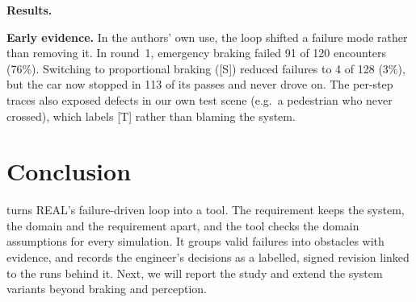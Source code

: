 \textbf{Results.} 

\textbf{Early evidence.} In the authors' own use, the loop shifted a failure
mode rather than removing it. In round~1, emergency braking failed 91 of 120
encounters (76\%). Switching to proportional braking ([S]) reduced failures
to 4 of 128 (3\%), but the car now stopped in 113 of its passes and never
drove on. The per-step traces also exposed defects in our own test scene
(e.g.\ a pedestrian who never crossed), which \toolname{} labels [T] rather
than blaming the system.

\section{Conclusion}
\label{sec:conclusion}
\toolname{} turns REAL's failure-driven loop into a tool. The requirement
keeps the system, the domain and the requirement apart, and the tool checks
the domain assumptions for every simulation. It groups valid failures into
obstacles with evidence, and records the engineer's decisions as a labelled,
signed revision linked to the runs behind it. Next, we will report the study
and extend the system variants beyond braking and perception.
